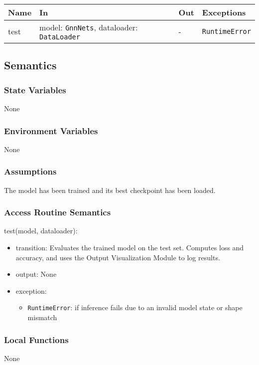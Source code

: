 \documentclass[12pt, titlepage]{article}
\begin{document}
\begin{center}
\begin{tabular}{p{2cm} p{6cm} p{4cm} p{3.5cm}}
\hline
\textbf{Name} & \textbf{In} & \textbf{Out} & \textbf{Exceptions} \\
\hline
test & model: \texttt{GnnNets}, dataloader: \texttt{DataLoader} & - & \texttt{RuntimeError} \\
\hline
\end{tabular}
\end{center}

\subsection{Semantics}

\subsubsection{State Variables}
None

\subsubsection{Environment Variables}
None

\subsubsection{Assumptions}
The model has been trained and its best checkpoint has been loaded.

\subsubsection{Access Routine Semantics}

\noindent test(model, dataloader):
\begin{itemize}
\item transition: Evaluates the trained model on the test set. Computes loss and accuracy, and uses the Output Visualization Module to log results.
\item output: None
\item exception:     
    \begin{itemize}
        \item \texttt{RuntimeError}: if inference fails due to an invalid model state or shape mismatch
    \end{itemize}
\end{itemize}

\subsubsection{Local Functions}
None
\end{document}
